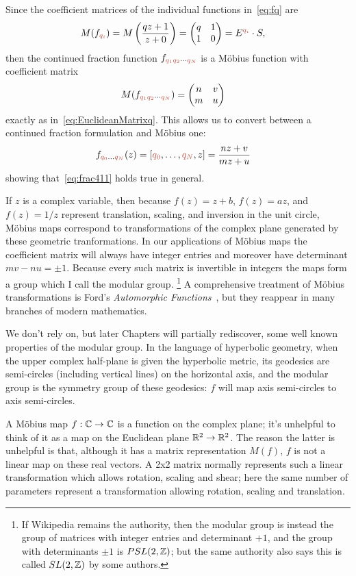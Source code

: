 Since the coefficient matrices of the individual  functions in~\eqref{eq:fq} are
\begin{align}
	M(f_\jqix{i})  &= M\left(\frac{q z+1}{z+0}\right)= \begin{pmatrix}
		q & 1 \\ 1 & 0
	\end{pmatrix}=  E^{\jqix{i}}\cdot S,
\end{align}
then the continued fraction function $	f_{\jqix{1}\jqix{2}\cdots\jqix{N}}$ is a M\"obius function with coefficient matrix 
\begin{align}
	M(f_{\jqix{1}\jqix{2}\cdots\jqix{N}})  &=	\begin{pmatrix} 
		n & v
		\\
		m & u
	\end{pmatrix}
\end{align}
exactly as in~\eqref{eq:EuclideanMatrixq}. This allows us to convert between a continued fraction formulation and M\"obius one:
\begin{align}
	f_{\jqix{0}\ldots \jqix{N}}(z) &=  [\jqix{0},\ldots ,\jqix{N}  , z]
	= \frac{nz+v}{mz+u} 
\end{align}
showing that~\eqref{eq:frac411} holds true in general. 

If $z$ is a complex variable, then because $f(z)=z+b$, $f(z)=a z$, and $f(z)=1/z$  represent translation, scaling, and inversion in the unit circle,  M\"obius maps correspond to transformations of the complex plane generated by these geometric tranformations.  In  our applications of M\"obius maps the coefficient matrix will always have integer entries and moreover have determinant $mv-nu=\pm 1$. Because every such matrix is invertible in integers the maps form a group which I call the modular group.%
\footnote{If Wikipedia remains the authority, then the modular group is instead the group of matrices with integer entries and determinant $+1$, and the group with determinants $\pm 1$ is  $PSL(2,\mathbb{Z})$; but the same authority also says this is called $SL(2,\mathbb{Z})$ by some authors.}
	 A comprehensive treatment of M\"obius transformations is Ford's \textit{Automorphic Functions}~\cite{fordAutomorphicFunctions1951}, but they reappear in many branches of modern mathematics. 

We don't rely on, but later Chapters will partially rediscover, some well known properties of the modular group. In the language of hyperbolic geometry, when the upper complex half-plane is given the hyperbolic metric, its geodesics are semi-circles (including vertical lines) on the horizontal axis, and the modular group is the symmetry group of these geodesics: $f$ will map axis semi-circles to axis semi-circles. 

A M\"obius map  $f:\mathbb{C}\rightarrow\mathbb{C}$ is a function on the complex plane; it's unhelpful to think of it as a map on the Euclidean plane $\mathbb{R}^2\rightarrow\mathbb{R}^2$.  The reason the latter is unhelpful is that, although it has a matrix representation $M(f)$,  $f$ is not a linear map on these real vectors. A 2x2 matrix normally represents such a linear transformation which allows rotation, scaling and shear; here the same number of parameters represent a transformation allowing rotation, scaling and translation. 


